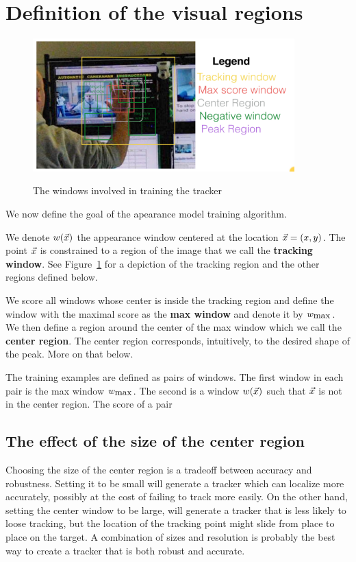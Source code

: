 \documentclass[11pt]{article}
\begin{document}
\section{Definition of the visual regions}

\begin{figure}[t]
\centering
  \includegraphics[width=0.9\textwidth] {Figures/TrackingRegions.png}
\label{fig:TrackingRegions}
\caption{The windows involved in training the tracker}
\end{figure}

We now define the goal of the apearance model training
algorithm.

We denote $w(\vec{x})$ the appearance window centered at the location
$\vec{x}=(x,y)$. The point $\vec{x}$ is constrained to a region of the image
that we call the {\bf tracking window}. See
Figure~\ref{fig:TrackingRegions} for a depiction of the tracking
region and the other regions defined below.

We score all windows whose center is inside the tracking region and
define the window with the maximal score as the {\bf max window} and
denote it by $w_{\mbox{max}}$. We then define a region around the center of the
max window which we call the {\bf center region}. The center region
corresponds, intuitively, to the desired shape of the peak. More on
that below.

The training examples are defined as pairs of windows. The first
window in each pair is the max window $w_{\mbox{max}}$. The second is a window
$w(\vec{x})$ such that $\vec{x}$ is not in the center region. The score of a pair


\subsection{The effect of the size of the center region}
Choosing the size of the center region is a tradeoff between accuracy
and robustness. Setting it to be small will generate a tracker which
can localize more accurately, possibly at the cost of failing to track
more easily. On the other hand, setting the center window to be large,
will generate a tracker that is less likely to loose tracking, but the
location of the tracking point might slide from place to place on the
target. A combination of sizes and resolution is probably the best way
to create a tracker that is both robust and accurate.
\end{document}
